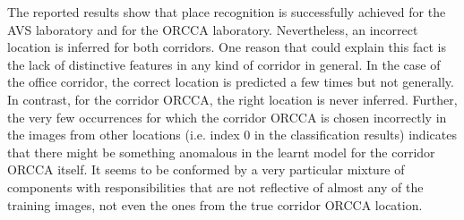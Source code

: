 The reported results show that place recognition is successfully achieved for the 
AVS laboratory and for the ORCCA laboratory. 
Nevertheless, an incorrect location is inferred for both corridors. 
One reason that could explain this fact is the lack of distinctive features in any kind of corridor in general. 
In the case of the office corridor, the correct location is predicted a few times but not generally. 
In contrast, for the corridor ORCCA, the right location is never inferred. Further, the very few occurrences 
for which the corridor ORCCA is chosen incorrectly in the images from other locations 
(i.e. index 0 in the classification results) indicates that there might be 
something anomalous in the learnt model for the corridor ORCCA itself. It seems to be conformed by a very particular mixture of 
components with responsibilities that are not reflective of almost any of the training images, not even the ones 
from the true corridor ORCCA location. 







